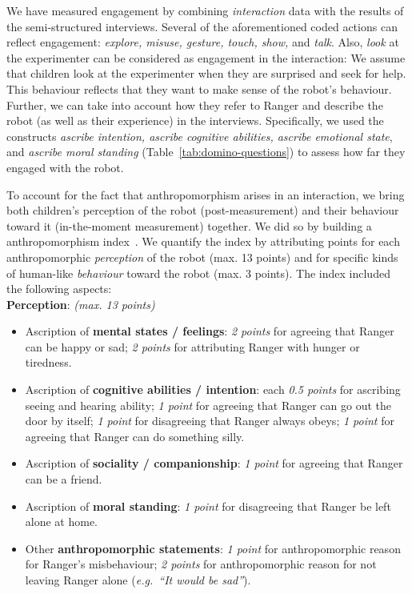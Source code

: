 \documentclass{sig-alternate}
\newcommand{\eg}{{\textit{e.g.~}}}
\begin{document}
We have measured engagement by combining \emph{interaction} data with the
results of the semi-structured interviews.  Several of the aforementioned coded
actions can reflect engagement: \textit{explore, misuse, gesture, touch, show,}
and \textit{talk}. Also, \textit{look} at the experimenter can be considered as
engagement in the interaction: We assume that children look at the experimenter
when they are surprised and seek for help.  This behaviour reflects that they
want to make sense of the robot's behaviour. Further, we can take into account
how they refer to Ranger and describe the robot (as well as their experience) in
the interviews.  Specifically, we used the constructs \textit{ascribe intention,
ascribe cognitive abilities, ascribe emotional state}, and \textit{ascribe moral
standing} (Table~\ref{tab:domino-questions}) to assess how far they engaged with
the robot.

To account for the fact that anthropomorphism arises in an interaction, we bring
both children's perception of the robot (post-measurement) and their behaviour
toward it (in-the-moment measurement) together. We did so by building a
anthropomorphism index~\cite{fink2014dynamics}. We quantify the
index by attributing points for each anthropomorphic \emph{perception} of the
robot (max.  13 points) and for specific kinds of human-like \emph{behaviour}
toward the robot (max.  3 points). The index included the following aspects:\\

\textbf{Perception}: \textit{(max. 13 points)}

\begin{itemize}
    \item Ascription of \textbf{mental states / feelings}: \textit{2 points} for agreeing
            that Ranger can be happy or sad; \textit{2 points} for attributing Ranger with
        hunger or tiredness.

    \item Ascription of \textbf{cognitive abilities / intention}: each \textit{0.5
        points} for ascribing seeing and hearing ability; \textit{1 point} for agreeing
            that Ranger can go out the door by itself; \textit{1 point} for disagreeing that
            Ranger always obeys; \textit{1 point} for agreeing that Ranger can do something
        silly.

    \item Ascription of \textbf{sociality / companionship}: \textit{1 point} for agreeing
        that Ranger can be a friend.

    \item Ascription of \textbf{moral standing}: \textit{1 point} for disagreeing that
        Ranger be left alone at home.

    \item Other \textbf{anthropomorphic statements}: \textit{1 point} for anthropomorphic
        reason for Ranger's misbehaviour; \textit{2 points} for anthropomorphic reason
        for not leaving Ranger alone (\eg \textit{``It would be sad''}).

\end{itemize}
\end{document}
